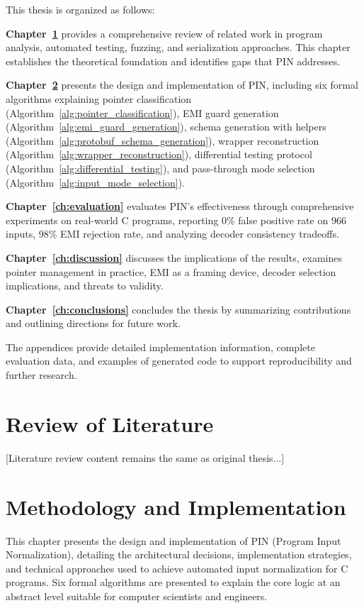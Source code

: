 \documentclass[doublespace,nopageskip]{VTthesis}
\begin{document}
  This thesis is organized as follows:

  \textbf{Chapter~\ref{ch:lit_review}} provides a comprehensive review of related work in program analysis, automated testing, fuzzing, and serialization approaches. This chapter establishes the theoretical foundation and identifies gaps that PIN addresses.

  \textbf{Chapter~\ref{ch:results}} presents the design and implementation of PIN, including six formal algorithms explaining pointer classification (Algorithm~\ref{alg:pointer_classification}), EMI guard generation (Algorithm~\ref{alg:emi_guard_generation}), schema generation with helpers (Algorithm~\ref{alg:protobuf_schema_generation}), wrapper reconstruction (Algorithm~\ref{alg:wrapper_reconstruction}), differential testing protocol (Algorithm~\ref{alg:differential_testing}), and pass-through mode selection (Algorithm~\ref{alg:input_mode_selection}).

  \textbf{Chapter~\ref{ch:evaluation}} evaluates PIN's effectiveness through comprehensive experiments on real-world C programs, reporting 0\% false positive rate on 966 inputs, 98\% EMI rejection rate, and analyzing decoder consistency tradeoffs.

  \textbf{Chapter~\ref{ch:discussion}} discusses the implications of the results, examines pointer management in practice, EMI as a framing device, decoder selection implications, and threats to validity.

  \textbf{Chapter~\ref{ch:conclusions}} concludes the thesis by summarizing contributions and outlining directions for future work.

  The appendices provide detailed implementation information, complete evaluation data, and examples of generated code to support reproducibility and further research.

    \chapter{Review of Literature} \label{ch:lit_review}

    [Literature review content remains the same as original thesis...]

  \chapter{Methodology and Implementation} \label{ch:results}

  This chapter presents the design and implementation of PIN (Program Input Normalization), detailing the architectural decisions, implementation strategies, and technical approaches used to achieve automated input normalization for C programs. Six formal algorithms are presented to explain the core logic at an abstract level suitable for computer scientists and engineers.
\end{document}

